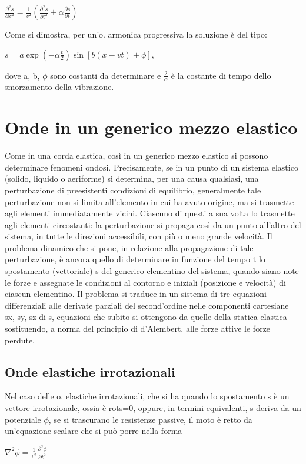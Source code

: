 \documentclass[a4paper]{article}
\begin{document}
$\frac{\partial^2 s}{\partial x^2}=\frac{1}{v^2}(\frac{\partial^2 s}{\partial t^2}+\alpha\frac{\partial s}{\partial t})$

Come si dimostra, per un’o. armonica progressiva la soluzione è del tipo:

$s = a \exp(- \alpha \frac{t}{2})\sin[b (x - vt) +\phi]$,

dove a, b, $\phi$ sono costanti da determinare e $\frac{2}{\alpha}$ è la costante di tempo dello smorzamento della vibrazione. 

\section{Onde in un generico mezzo elastico}
Come in una corda elastica, così in un generico mezzo elastico si possono determinare fenomeni ondosi. Precisamente, se in un punto di un sistema elastico (solido, liquido o aeriforme) si determina, per una causa qualsiasi, una perturbazione di preesistenti condizioni di equilibrio, generalmente tale perturbazione non si limita all’elemento in cui ha avuto origine, ma si trasmette agli elementi immediatamente vicini. Ciascuno di questi a sua volta lo trasmette agli elementi circostanti: la perturbazione si propaga così da un punto all’altro del sistema, in tutte le direzioni accessibili, con più o meno grande velocità. Il problema dinamico che si pone, in relazione alla propagazione di tale perturbazione, è ancora quello di determinare in funzione del tempo t lo spostamento (vettoriale) s del generico elementino del sistema, quando siano note le forze e assegnate le condizioni al contorno e iniziali (posizione e velocità) di ciascun elementino. Il problema si traduce in un sistema di tre equazioni differenziali alle derivate parziali del second’ordine nelle componenti cartesiane sx, sy, sz di s, equazioni che subito si ottengono da quelle della statica elastica sostituendo, a norma del principio di d’Alembert, alle forze attive le forze perdute.

\subsection{Onde elastiche irrotazionali}
Nel caso delle o. elastiche irrotazionali, che si ha quando lo spostamento s è un vettore irrotazionale, ossia è rots=0, oppure, in termini equivalenti, s deriva da un potenziale $\phi$, se si trascurano le resistenze passive, il moto è retto da un’equazione scalare che si può porre nella forma 

$\nabla^2\phi=\frac{1}{v^2}\frac{\partial^2 \phi}{\partial t^2}$
\end{document}
